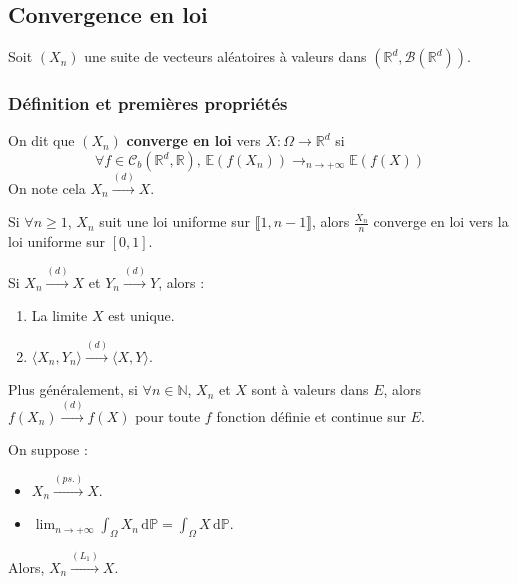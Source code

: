   \subsection{Convergence en loi}

  Soit $(X_n)$ une suite de vecteurs aléatoires à valeurs dans $(\mathbb{R}^d, \mathcal{B}(\mathbb{R}^d))$.

  \subsubsection{Définition et premières propriétés}


  \begin{definition}
    On dit que $(X_n)$ \textbf{converge en loi} vers $X : \Omega \rightarrow \mathbb{R}^d$ si
    \[ \forall f \in \mathcal{C}_b(\mathbb{R}^d, \mathbb{R}), \, \mathbb{E}(f(X_n)) \longrightarrow_{n \rightarrow +\infty} \mathbb{E}(f(X)) \]
    On note cela $X_n \overset{(d)}{\longrightarrow} X$.
  \end{definition}


  \begin{example}
    Si $\forall n \geq 1$, $X_n$ suit une loi uniforme sur $\llbracket 1, n-1 \rrbracket$, alors $\frac{X_n}{n}$ converge en loi vers la loi uniforme sur $[0,1]$.
  \end{example}


  \begin{proposition}
    Si $X_n \overset{(d)}{\longrightarrow} X$ et $Y_n \overset{(d)}{\longrightarrow} Y$, alors :
    \begin{enumerate}[label=(\roman*)]
      \item La limite $X$ est unique.
      \item $\langle X_n, Y_n \rangle \overset{(d)}{\longrightarrow} \langle X, Y \rangle$.
    \end{enumerate}
    Plus généralement, si $\forall n \in \mathbb{N}$, $X_n$ et $X$ sont à valeurs dans $E$, alors $f(X_n) \overset{(d)}{\longrightarrow} f(X)$ pour toute $f$ fonction définie et continue sur $E$.
  \end{proposition}

  \begin{theorem}
    On suppose :
    \begin{itemize}
      \item $X_n \overset{(ps.)}{\longrightarrow} X$.
      \item $\lim_{n \rightarrow +\infty} \int_\Omega X_n \, \mathrm{d}\mathbb{P} = \int_\Omega X \, \mathrm{d}\mathbb{P}$.
    \end{itemize}
    Alors, $X_n \overset{(L_1)}{\longrightarrow} X$.
  \end{theorem}

